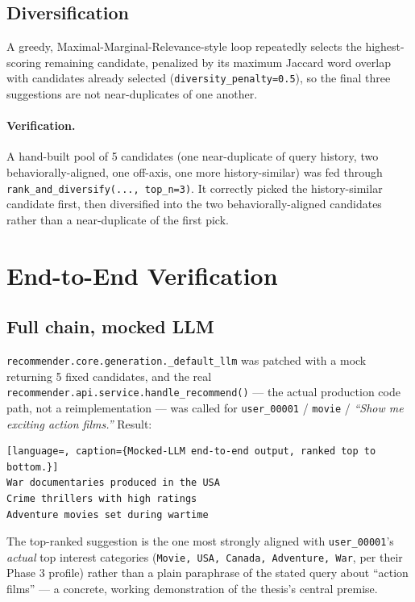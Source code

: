 \documentclass[11pt,a4paper]{article}
\newcommand{\code}[1]{\texttt{#1}}
\begin{document}
\subsection{Diversification}

A greedy, Maximal-Marginal-Relevance-style loop repeatedly selects the highest-scoring remaining
candidate, penalized by its maximum Jaccard word overlap with candidates already selected
(\code{diversity\_penalty=0.5}), so the final three suggestions are not near-duplicates of one
another.

\paragraph{Verification.} A hand-built pool of 5 candidates (one near-duplicate of query history,
two behaviorally-aligned, one off-axis, one more history-similar) was fed through
\code{rank\_and\_diversify(..., top\_n=3)}. It correctly picked the history-similar candidate
first, then diversified into the two behaviorally-aligned candidates rather than a near-duplicate
of the first pick.

\section{End-to-End Verification}

\subsection{Full chain, mocked LLM}

\code{recommender.core.generation.\_default\_llm} was patched with a mock returning 5 fixed
candidates, and the real \code{recommender.api.service.handle\_recommend()} --- the actual
production code path, not a reimplementation --- was called for \code{user\_00001} / \code{movie}
/ \emph{``Show me exciting action films.''} Result:

\begin{lstlisting}[language=, caption={Mocked-LLM end-to-end output, ranked top to bottom.}]
War documentaries produced in the USA
Crime thrillers with high ratings
Adventure movies set during wartime
\end{lstlisting}

The top-ranked suggestion is the one most strongly aligned with \code{user\_00001}'s \emph{actual}
top interest categories (\code{Movie, USA, Canada, Adventure, War}, per their Phase 3 profile)
rather than a plain paraphrase of the stated query about ``action films'' --- a concrete, working
demonstration of the thesis's central premise.
\end{document}
